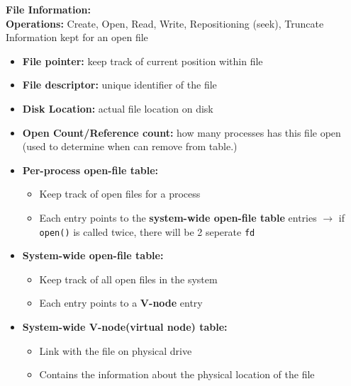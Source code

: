 \documentclass[10pt,landscape]{article}
\begin{document}
\begin{multicols*}{3}
\textbf{File Information:} \\ 
\textbf{Operations:} Create, Open, Read, Write, Repositioning (seek), Truncate
Information kept for an open file
\begin{itemize}[topsep=0pt,noitemsep,wide=0pt, leftmargin=\dimexpr{} + 2\relax]
    \item \textbf{File pointer:} keep track of current position within file
    \item \textbf{File descriptor:} unique identifier of the file
    \item \textbf{Disk Location:} actual file location on disk
    \item \textbf{Open Count/Reference count:} how many processes has this file open (used to determine when can remove from table.)
\end{itemize}

\begin{itemize}[topsep=0pt,noitemsep,wide=0pt, leftmargin=\dimexpr{} + 2\relax]
    \item \textbf{Per-process open-file table:}
    \begin{itemize}[topsep=0pt,noitemsep,wide=0pt, leftmargin=\dimexpr{} + 2\relax]
        \item Keep track of open files for a process
        \item Each entry points to the \textbf{system-wide open-file table} entries $\rightarrow$ if \verb|open()| is called twice, there will be 2 seperate \verb|fd|
    \end{itemize}
    \item \textbf{System-wide open-file table:}
    \begin{itemize}[topsep=0pt,noitemsep,wide=0pt, leftmargin=\dimexpr{} + 2\relax]
        \item Keep track of all open files in the system
        \item Each entry points to a \textbf{V-node} entry
    \end{itemize}
    \item \textbf{System-wide V-node(virtual node) table:}
    \begin{itemize}[topsep=0pt,noitemsep,wide=0pt, leftmargin=\dimexpr{} + 2\relax]
        \item Link with the file on physical drive
        \item Contains the information about the physical location of the file
    \end{itemize}
\end{itemize}


\end{multicols*}
\end{document}

